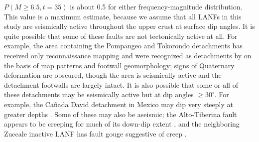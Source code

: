 \documentclass[twocolumn,grl]{AGUTeX}
\begin{document}
\begin{article}
$P(M\ge6.5, t=35)$ is about 0.5 for either frequency-magnitude distribution.
This value is a maximum estimate, because we assume that all LANFs in this
study are seismically active throughout the upper crust at surface dip angles.
It is quite possible that some of these faults are not tectonically active
at all. For example, the area containing the Pompangeo and Tokorondo
detachments has received only reconnaissance mapping
\citep{parkinson1998sulawesi} and were recognized as detachments by
\citet{spencer2011} on the basis of map patterns and footwall geomorphology;
signs of Quaternary deformation are obscured, though the area is seismically
active and the detachment footwalls are largely intact.
It is also possible that some or all of these detachments may be seismically
active but at dip angles $\ge30^\circ$.  For example, the Ca\~nada David
detachment in Mexico may dip very steeply at greater depths 
\citep{fletcherspelz2009}.
Some of these may also be aseismic; the Alto-Tiberina fault appears to
be creeping for much of its down-dip extent
\citep{hreinsdottir2009altotib}, and the neighboring Zuccale inactive
LANF has fault gouge suggestive of creep  \citep{collettiniholdsworth2004}.



\end{article}
\end{document}
